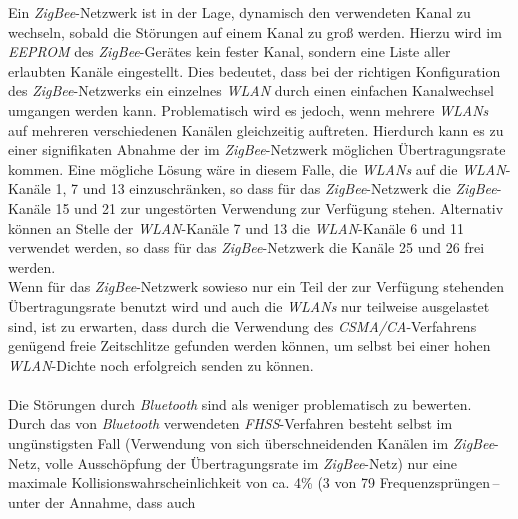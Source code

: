                 Ein \emph{ZigBee}-Netzwerk ist in der Lage, dynamisch den verwendeten Kanal zu wechseln, sobald die
                Störungen auf einem Kanal zu groß werden. Hierzu wird im \emph{EEPROM} des \emph{ZigBee}-Gerätes kein fester
                Kanal, sondern eine Liste aller erlaubten Kanäle eingestellt. Dies bedeutet, dass bei der
                richtigen Konfiguration des \emph{ZigBee}-Netzwerks ein einzelnes \emph{WLAN} durch einen einfachen 
                Kanalwechsel umgangen werden kann. Problematisch wird es jedoch, wenn mehrere \emph{WLANs} auf mehreren
                verschiedenen Kanälen gleichzeitig auftreten. Hierdurch kann es zu einer signifikaten Abnahme der im 
                \emph{ZigBee}-Netzwerk möglichen Übertragungsrate kommen. Eine mögliche Lösung wäre in diesem Falle, die 
                \emph{WLANs} auf die \emph{WLAN}-Kanäle 1, 7 und 13 einzuschränken, so dass für das 
                \emph{ZigBee}-Netzwerk die \emph{ZigBee}-Kanäle 15 und 21 zur ungestörten Verwendung zur Verfügung 
                stehen. Alternativ können an Stelle der \emph{WLAN}-Kanäle 7 und 13 die \emph{WLAN}-Kanäle 6 und 11 
                verwendet werden, so dass für das \emph{ZigBee}-Netzwerk die Kanäle 25 und 26 frei werden.\\
                Wenn für das \emph{ZigBee}-Netzwerk sowieso nur ein Teil der zur Verfügung stehenden Übertragungsrate benutzt
                wird und auch die \emph{WLANs} nur teilweise ausgelastet sind, ist zu erwarten, dass durch die Verwendung
                des \emph{CSMA/CA}-Verfahrens genügend freie Zeitschlitze gefunden werden können, um selbst bei einer
                hohen \emph{WLAN}-Dichte noch erfolgreich senden zu können.\\
                \\
                Die Störungen durch \emph{Bluetooth} sind als weniger problematisch zu bewerten. Durch das von 
                \emph{Bluetooth} verwendeten \emph{FHSS}-Verfahren besteht selbst im ungünstigsten Fall 
                (Verwendung von sich überschneidenden Kanälen im \emph{ZigBee}-Netz, volle Ausschöpfung der 
                 Übertragungsrate im \emph{ZigBee}-Netz) nur eine maximale Kollisionswahrscheinlichkeit von ca. 
                4\% (3 von 79 Frequenzsprüngen\,--\,unter der Annahme, dass auch
